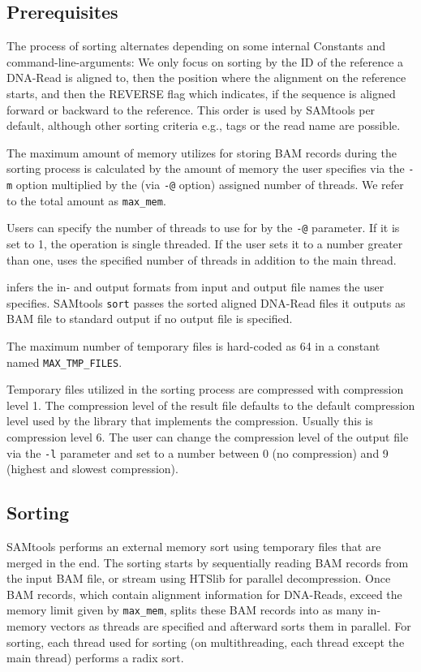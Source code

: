 \subsection{Prerequisites}
The process of sorting alternates depending on some internal Constants and command-line-arguments: 
We only focus on sorting by the ID of the reference a DNA-Read is aligned to, then the position where the alignment on the reference starts, and then the REVERSE flag which indicates, if the sequence is aligned forward or backward to the reference. This order is used by SAMtools per default, although other sorting criteria e.g., tags or the read name are possible.

The maximum amount of memory \sort utilizes for storing BAM records during the sorting process is calculated by the amount of memory the user specifies via the \texttt{-m} option multiplied by the (via \texttt{-@} option) assigned number of threads. We refer to the total amount as \texttt{max\_mem}. 

Users can specify the number of threads to use for \sort by the \texttt{-@} parameter. If it is set to 1, the operation is single threaded. If the user sets it to a number greater than one, \sort uses the specified number of threads in addition to the main thread.

\sort infers the in- and output formats from input and output file names the user specifies. SAMtools \texttt{sort} passes the sorted aligned DNA-Read files it outputs as BAM file to standard output if no output file is specified.

The maximum number of temporary files is hard-coded as 64 in a constant named \texttt{MAX\_TMP\_FILES}. 

Temporary files utilized in the sorting process are compressed with compression level 1. The compression level of the result file defaults to the default compression level used by the library that implements the compression. Usually this is compression level 6. The user can change the compression level of the output file via the \texttt{-l} parameter and set to a number between 0 (no compression) and 9 (highest and slowest compression).

\subsection{Sorting} \label{sorting}

SAMtools performs an external memory sort using temporary files that are merged in the end.
The sorting starts by sequentially reading BAM records from the input BAM file, or stream using HTSlib for parallel decompression. Once BAM records, which contain alignment information for DNA-Reads, exceed the memory limit given by \texttt{max\_mem}, \sort splits these BAM records into as many in-memory vectors as threads are specified and afterward sorts them in parallel. For sorting, each thread used for sorting (on multithreading, each thread except the main thread) performs a radix sort.

